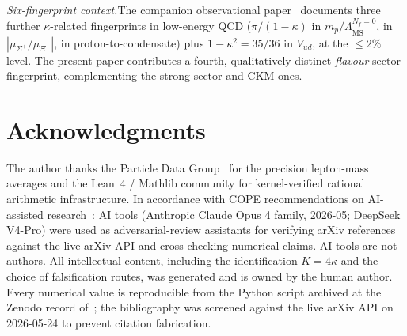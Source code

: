 \documentclass[aps,prl,reprint,amsmath,amssymb,nofootinbib,floatfix,superscriptaddress]{revtex4-2}
\newcommand{\msbar}{\overline{\mathrm{MS}}}
\begin{document}
\textit{Six-fingerprint context.}\quad The companion observational paper~\cite{Remondiere2026c} documents three further $\kappa$-related fingerprints in low-energy QCD ($\pi/(1{-}\kappa)$ in $m_p/\Lambda^{N_f{=}0}_{\msbar}$, in $|\mu_{\Sigma^+}/\mu_{\Xi^-}|$, in proton-to-condensate) plus $1{-}\kappa^2 = 35/36$ in $V_{ud}$, at the $\le 2\%$ level. The present paper contributes a fourth, qualitatively distinct \emph{flavour}-sector fingerprint, complementing the strong-sector and CKM ones.

\section*{Acknowledgments}

The author thanks the Particle Data Group~\cite{PDG2024} for the precision lepton-mass averages and the Lean~4 / Mathlib community for kernel-verified rational arithmetic infrastructure. In accordance with COPE recommendations on AI-assisted research~\cite{COPE2023}: AI tools (Anthropic Claude Opus 4 family, 2026-05; DeepSeek V4-Pro) were used as adversarial-review assistants for verifying arXiv references against the live arXiv API and cross-checking numerical claims. AI tools are not authors. All intellectual content, including the identification $K = 4\kappa$ and the choice of falsification routes, was generated and is owned by the human author. Every numerical value is reproducible from the Python script archived at the Zenodo record of~\cite{Remondiere2026b}; the bibliography was screened against the live arXiv API on 2026-05-24 to prevent citation fabrication.
\end{document}
